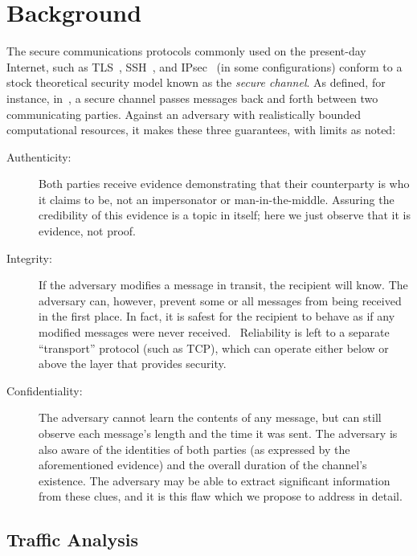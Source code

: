 \documentclass[oneside]{zarticle}
\begin{document}
\section{Background}

The secure communications protocols commonly used on the present-day
Internet, such as TLS~\cite{dierks2008tls}, SSH~\cite{ylonen2006ssh},
and IPsec~\cite{kent2005ipsec} (in some configurations) conform to a
stock theoretical security model known as the \emph{secure channel}.
As defined, for instance, in~\textcite{ferguson2010ceng}, a secure
channel passes messages back and forth between two communicating
parties.  Against an adversary with realistically bounded
computational resources, it makes these three guarantees, with limits
as noted:

\begin{description}
\item[Authenticity:] Both parties receive evidence demonstrating that
  their counterparty is who it claims to be, not an impersonator or
  man-in-the-middle.  Assuring the credibility of this evidence is a
  topic in itself; here we just observe that it is evidence, not
  proof.

\item[Integrity:] If the adversary modifies a message in transit, the
  recipient will know.  The adversary can, however, prevent some or
  all messages from being received in the first place.  In fact, it is
  safest for the recipient to behave as if any modified messages were
  never received.~\cite{mitchell2005error} Reliability is left to a
  separate “transport” protocol (such as TCP), which can operate
  either below or above the layer that provides security.

\item[Confidentiality:] The adversary cannot learn the contents of any
  message, but can still observe each message's length and the time it
  was sent.  The adversary is also aware of the identities of both
  parties (as expressed by the aforementioned evidence) and the
  overall duration of the channel's existence.  The adversary may be
  able to extract significant information from these clues, and it is
  this flaw which we propose to address in detail.
\end{description}

\subsection{Traffic Analysis}
\end{document}
